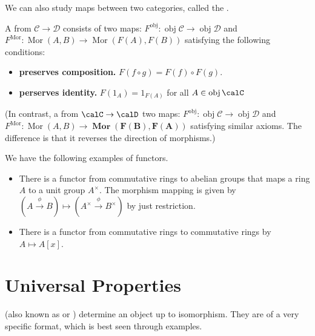 We can also study maps between two categories,
called the .
\begin{definition}
    A  from $\mathcal C\to\mathcal D$
    consists of two maps:
    $F^{\text{obj}} : \operatorname{obj} \mathcal C
    \to\operatorname{obj} \mathcal D$
    and $F^{\text{Mor}} : 
    \operatorname{Mor}(A,B) \to \operatorname{Mor}(F(A),F(B))$
    satisfying the following conditions:
    \begin{itemize}
    \item \textbf{preserves composition.}
    $F(f\circ g) = F(f)\circ F(g)$.
    \item \textbf{perserves identity.}
    $F(1_A) = 1_{F(A)}$ for all $A\in\operatorname{obj}\calC$
    \end{itemize}

    (In contrast, a 
    from $\calC\to \calD$ two maps:
    $F^{\text{obj}} : \operatorname{obj} \mathcal C
    \to\operatorname{obj} \mathcal D$
    and $F^{\text{Mor}} : 
    \operatorname{Mor}(A,B) \to 
    \boldsymbol{\operatorname{Mor}(F(B),F(A))}$
    satisfying similar axioms.
    The difference is that it reverses the direction of morphisms.)
\end{definition}
\begin{example}
    We have the following examples of functors.
    \begin{itemize}
	\item There is a functor from commutative rings
    to abelian groups that maps a ring $A$
    to a unit group $A^\times$.
    The morphism mapping is given by
    $(A\stackrel\phi\to B) \mapsto (A^\times\stackrel\phi\to B^\times)$
    by just restriction.
    \item There is a functor from commutative rings
	to commutative rings by $A\mapsto A[x]$.
    \end{itemize}
\end{example}
\section{Universal Properties}
\label{sec:universal}
(also known as 
or )
determine an object up to isomorphism.
They are of a very specific format, which is best seen through examples.


